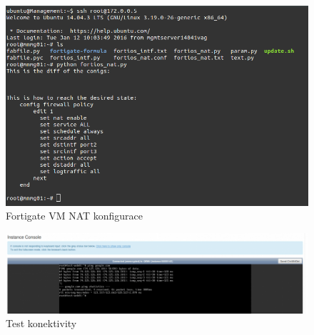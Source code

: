 \begin{figure}[h]
\begin{centering}
\includegraphics[scale=0.45]{images/fortigate_nat}
\par\end{centering}
\caption{Fortigate VM NAT konfigurace\label{fig:fortigate_nat}}
\end{figure}

\begin{figure}[h]
\begin{centering}
\includegraphics[scale=0.45]{images/fortigate_ping}
\par\end{centering}
\caption{Test konektivity\label{fig:fortigate_ping}}
\end{figure}
